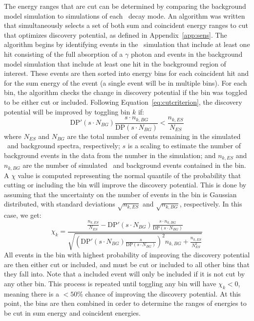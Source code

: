 \documentclass[/main.tex]{subfiles}
\begin{document}
The energy ranges that are cut can be determined by comparing the background model simulation to simulations of each \bbes\ decay mode.
An algorithm was written that simultaneously selects a set of both sum and coincident energy ranges to cut that optimizes discovery potential, as defined in Appendix~\ref{app:sens}.
The algorithm begins by identifying events in the \bbes\ simulation that include at least one hit consisting of the full absorption of a $\gamma$ photon and events in the background model simulation that include at least one hit in the background region of interest.
These events are then sorted into energy bins for each coincident hit and for the sum energy of the event (a single event will be in multiple bins).
For each bin, the algorithm checks the change in discovery potential if the bin was toggled to be either cut or included.
Following Equation~\ref{eq:cutcriterion}, the discovery potential will be improved by toggling bin $k$ if:
\begin{equation}
  \mathrm{DP}'(s\cdot N_{BG})\frac{s\cdot n_{k,BG}}{\mathrm{DP}(s\cdot N_{BG})} < \frac{n_{k,ES}}{N_{ES}}
\end{equation}
where $N_{ES}$ and $N_{BG}$ are the total number of events remaining in the simulated \bbes\ and background spectra, respectively; $s$ is a scaling to estimate the number of background events in the data from the number in the simulation; and $n_{k,ES}$ and $n_{k,BG}$ are the number of simulated \bbes\ and background events contained in the bin.
A $\chi$ value is computed representing the normal quantile of the probability that cutting or including the bin will improve the discovery potential.
This is done by assuming that the uncertainty on the number of events in the bin is Gaussian distributed, with standard deviations $\sqrt{n_{k,ES}}$ and $\sqrt{n_{k,BG}}$, respectively.
In this case, we get:
\begin{equation}
  \chi_k = \frac{ \frac{n_{k,ES}}{N_{ES}} - \mathrm{DP}'(s\cdot N_{BG})\frac{s\cdot n_{k,BG}}{\mathrm{DP}(s\cdot N_{BG})} }{ \sqrt{ \left(\mathrm{DP}'(s\cdot N_{BG})\frac{s}{\mathrm{DP}(s\cdot N_{BG})}\right)^2n_{k,BG} + \frac{n_{k,ES}}{N_{ES}^2} } }
\end{equation}
All events in the bin with highest probability of improving the discovery potential are then either cut or included, and must be cut or included to all other bins that they fall into.
Note that a included event will only be included if it is not cut by any other bin.
This process is repeated until toggling any bin will have $\chi_k<0$, meaning there is a $<50$\% chance of improving the discovery potential.
At this point, the bins are then combined in order to determine the ranges of energies to be cut in sum energy and coincident energies.
\end{document}
